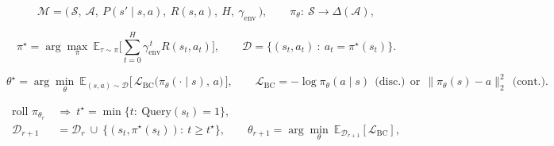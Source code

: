 
\begin{equation}
\mathcal{M} = \big(\, \mathcal{S},\ \mathcal{A},\ P(s'\mid s,a),\ R(s,a),\ H,\ \gamma_{\mathrm{env}} \,\big),
\qquad
\pi_\theta:\ \mathcal{S}\to\Delta(\mathcal{A}),
\label{eq:mdp}
\end{equation}

\begin{equation}
\pi^\star=\arg\max_{\pi}\ \mathbb{E}_{\tau\sim\pi}\!\Big[\textstyle\sum_{t=0}^{H}\gamma_{\mathrm{env}}^{\,t} R(s_t,a_t)\Big],
\qquad
\mathcal{D}=\big\{(s_t,a_t)\ :\ a_t=\pi^\star(s_t)\big\}.
\label{eq:expert}
\end{equation}

\begin{equation}
\theta^\star=\arg\min_{\theta}\ \mathbb{E}_{(s,a)\sim\mathcal{D}}\big[\,\mathcal{L}_{\mathrm{BC}}\big(\pi_\theta(\cdot\mid s),\,a\big)\,\big],
\qquad
\mathcal{L}_{\mathrm{BC}}=-\log\pi_\theta(a\mid s)\ \ \text{(disc.)}\ \ \text{or}\ \ \|\pi_\theta(s)-a\|_2^2\ \ \text{(cont.)}.
\label{eq:bc}
\end{equation}

\begin{align}
\text{roll } \pi_{\theta_r}\ &\Rightarrow\ t^\star=\min\{t:\ \mathrm{Query}(s_t)=1\}, \nonumber\\
\mathcal{D}_{r+1}&=\mathcal{D}_r\ \cup\ \big\{(s_t,\pi^\star(s_t)):\ t\ge t^\star\big\},\qquad
\theta_{r+1}=\arg\min_{\theta}\ \mathbb{E}_{\mathcal{D}_{r+1}}[\mathcal{L}_{\mathrm{BC}}],
\label{eq:iil-loop}
\end{align}



